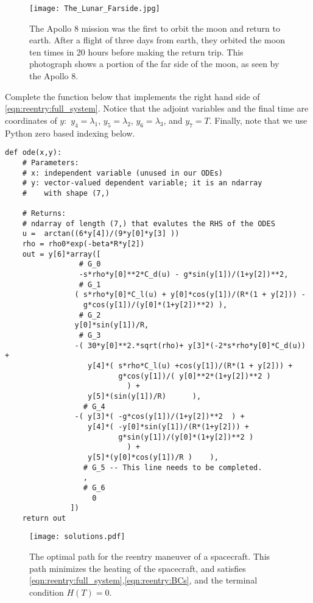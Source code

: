 \begin{figure}
\centering
\texttt{[image: The\_Lunar\_Farside.jpg]}
\caption{ The Apollo 8 mission was the first to orbit the moon and return to earth. 
After a flight of three days from earth, they orbited the moon ten times in 20 hours before making the return trip. 
This photograph  shows a portion of the far side of the moon, as seen by the Apollo 8.
}
\label{fig:reentry:Lunar_Farside}
\end{figure}



\begin{problem}
Complete the function  below that implements the right hand side of \eqref{eqn:reentry:full_system}. 
Notice that the adjoint variables and the final time are coordinates of $y:$ $y_4 = \lambda_1$, $y_5 = \lambda_2$, $y_6=\lambda_3$, and $y_7 = T$. Finally, note that we use Python zero based indexing below.
\begin{lstlisting}
def ode(x,y):
	# Parameters:
	# x: independent variable (unused in our ODEs)
	# y: vector-valued dependent variable; it is an ndarray 
	# 	 with shape (7,)
	
	# Returns: 
	# ndarray of length (7,) that evalutes the RHS of the ODES
	u =	 arctan((6*y[4])/(9*y[0]*y[3] ))
	rho = rho0*exp(-beta*R*y[2])
	out = y[6]*array([
				 # G_0
				 -s*rho*y[0]**2*C_d(u) - g*sin(y[1])/(1+y[2])**2,	
				 # G_1	 
				( s*rho*y[0]*C_l(u) + y[0]*cos(y[1])/(R*(1 + y[2])) - 
				  g*cos(y[1])/(y[0]*(1+y[2])**2) ),						 
				 # G_2
				y[0]*sin(y[1])/R,		
				 # G_3								 
				-( 30*y[0]**2.*sqrt(rho)+ y[3]*(-2*s*rho*y[0]*C_d(u)) + 
				   y[4]*( s*rho*C_l(u) +cos(y[1])/(R*(1 + y[2])) + 
						  g*cos(y[1])/( y[0]**2*(1+y[2])**2 ) 
							) + 
				   y[5]*(sin(y[1])/R)	   ),	
				  # G_4						 
				-( y[3]*( -g*cos(y[1])/(1+y[2])**2	) + 
				   y[4]*( -y[0]*sin(y[1])/(R*(1+y[2])) + 
						  g*sin(y[1])/(y[0]*(1+y[2])**2 ) 
							) + 
				   y[5]*(y[0]*cos(y[1])/R )	   ),
				  # G_5 -- This line needs to be completed.						 
				  ,			
				  # G_6	
					0 									 
			   ])
	return out
\end{lstlisting}
\end{problem}

\begin{figure}
\centering
\texttt{[image: solutions.pdf]}
\caption{The optimal path for the reentry maneuver of a spacecraft. 
This path minimizes the heating of the spacecraft, and satisfies  \eqref{eqn:reentry:full_system},\eqref{eqn:reentry:BCs}, and the terminal condition $H(T) = 0$.
}
\label{fig:reentry:solutions}
\end{figure}


